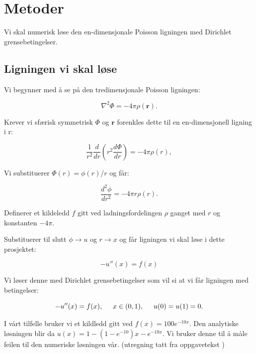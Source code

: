 \documentclass[reprint,english,notitlepage]{revtex4-1}
\begin{document}
\section{Metoder} %
	Vi skal numerisk løse den en-dimensjonale Poisson ligningen med Dirichlet grensebetingelser.

\subsection{Ligningen vi skal løse}

	Vi begynner med å se på den tredimensjonale Poisson ligningen:
	
	\begin{equation*}
	\nabla^2 \Phi = -4\pi \rho (\mathbf{r}).
	\end{equation*}
	
	Krever vi sfærisk symmetrisk $\Phi$ og $\mathbf{r}$ forenkles dette til en en-dimensjonell ligning i r:
	
	\begin{equation*}
	\frac{1}{r^2}\frac{d}{dr}\left(r^2\frac{d\Phi}{dr}\right) = -4\pi \rho(r),
	\end{equation*}
	
	Vi substituerer $\Phi(r)= \phi(r)/r$ og får:
	
	\begin{equation*}
	\frac{d^2\phi}{dr^2}= -4\pi r\rho(r).
	\end{equation*}
	
	Definerer et kildeledd $f$ gitt ved ladningsfordelingen $\rho$ ganget med $r$ og konstanten $-4\pi$.
	
	Substituerer til slutt $\phi\rightarrow u$ og $r\rightarrow x$ og får ligningen vi skal løse i dette prosjektet:
	
	\begin{equation*}
	-u''(x) = f(x)
	\end{equation*}
	
	Vi løser denne med Dirichlet grensebetingelser som vil si at vi får ligningen med betingelser:
	
	\begin{equation*}
	-u''(x) = f(x), \hspace{0.5cm} x\in(0,1), \hspace{0.5cm} u(0) = u(1) = 0.
	\end{equation*}
	
	I vårt tilfelle bruker vi et kildledd gitt ved $f(x) = 100e^{-10x}$. Den analytiske løsningen blir da $u(x) = 1 - (1 - e^{-10})x - e^{-10x}$. Vi bruker denne til å måle feilen til den numeriske løsningen vår. (utregning tatt fra oppgavetekst \cite{oppgavetekst})
\end{document}
